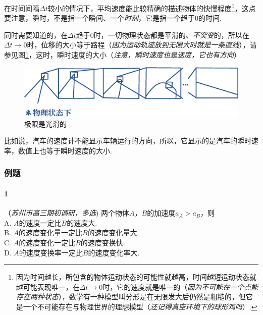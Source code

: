 				在时间间隔$\Delta t$较小的情况下，平均速度能比较精确的描述物体的快慢程度\footnote{因为时间越长，所包含的物体运动状态的可能性就越高，时间越短运动状态就越可能表现唯一，在$\Delta t\to 0$时，它的速度就是唯一的（\emph{因为不可能在一个点能存在两种状态}），数学有一种模型叫分形是在无限发大后仍然是粗糙的，但它是一个不可能存在与物理世界的理想模型（\emph{还记得真空环境下的球形鸡吗}）.}，这点要注意，瞬时，不是指一个瞬间、一个\emph{时刻}，它是指一个趋于$0$的时间.

				同时需要知道的，在$\Delta t$趋于$0$时，一切物理状态都是平滑的、\emph{不突变}的，所以在$\Delta t\to 0$时，位移的大小等于路程（\emph{因为运动轨迹放到无限大时就是一条直线}），请参见图\ref{Pic::极限是光滑的}，这时，瞬时速度的大小（\emph{注意，瞬时速度也是速度，它也有方向}）
				\begin{figure}
					\centering
					\includegraphics[scale=0.3]{PIC/003.eps}
					\caption{极限是光滑的}
					\label{Pic::极限是光滑的}
				\end{figure}

				比如说，汽车的速度计不能显示车辆运行的方向，所以，它显示的是汽车的瞬时速率，数值上也等于瞬时速度的大小.

			\subsubsection{例题}
				\paragraph{1}（\emph{苏州市高三期初调研，多选})
					两个物体$A$，$B$的加速度$a_A>a_B$，则\mathcnl\\
					A. $A$的速度一定比$B$的速度大.\\
					B. $A$的速度变化量一定比$B$的速度变化量大.\\
					C. $A$的速度变化一定比$B$的速度变换快.\\
					D. $A$的速度变换率一定比$B$的速度变化率大.\\
